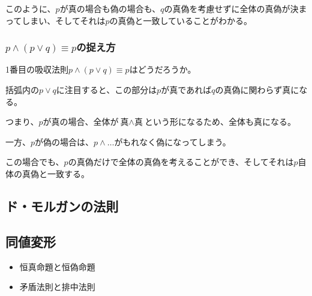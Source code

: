 \documentclass[../../imaging-math]{subfiles}
\begin{document}
\br

このように、$p$が真の場合も偽の場合も、$q$の真偽を考慮せずに全体の真偽が決まってしまい、そしてそれは$p$の真偽と一致していることがわかる。

\subsubsection{$p \land (p \lor q) \equiv p$の捉え方}

1番目の吸収法則$p \land (p \lor q) \equiv p$はどうだろうか。

\br

\begin{tcolorbox}[empty, size=minimal, sidebyside, righthand ratio=0.35]
  括弧内の$p \lor q$に注目すると、この部分は$p$が真であれば$q$の真偽に関わらず真になる。

  つまり、$p$が真の場合、全体が$\text{真} \land \text{真}$という形になるため、全体も真になる。

  \br

  一方、$p$が偽の場合は、$p \land \ldots$がもれなく偽になってしまう。

  \tcblower

  \centering
\end{tcolorbox}

\br

この場合でも、$p$の真偽だけで全体の真偽を考えることができ、そしてそれは$p$自体の真偽と一致する。

\subsection{ド・モルガンの法則}

\subsection{同値変形}

\begin{mindflow}
  \begin{itemize}
    \item 恒真命題と恒偽命題
    \item 矛盾法則と排中法則
  \end{itemize}
\end{mindflow}
\end{document}
